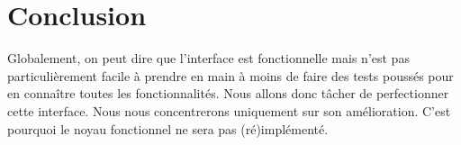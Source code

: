 \documentclass[12pt, a4paper]{article}
\begin{document}
\section{Conclusion}
Globalement, on peut dire que l'interface est fonctionnelle mais n'est pas particulièrement facile à prendre en main à moins de faire 
des tests poussés pour en connaître toutes les fonctionnalités. Nous allons donc tâcher de perfectionner cette interface. 
Nous nous concentrerons uniquement sur son amélioration. C'est pourquoi le noyau fonctionnel ne sera pas (ré)implémenté.
\end{document}
